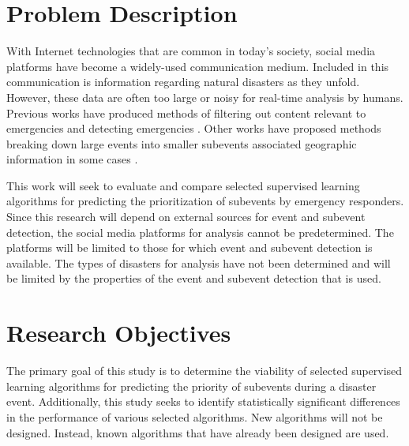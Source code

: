 \documentclass[conference]{IEEEtran}
\begin{document}
\maketitle






%
\IEEEpeerreviewmaketitle



\section{Problem Description}
With Internet technologies that are common in today’s society, social media platforms have become a widely-used communication medium. Included in this communication is information regarding natural disasters as they unfold. However, these data are often too large or noisy for real-time analysis by humans. Previous works have produced methods of filtering out content relevant to emergencies and detecting emergencies \cite{Avvenuti}. Other works have proposed methods breaking down large events into smaller subevents associated geographic information in some cases \cite{Pohl,Khurdiya,Hua}. 

This work will seek to evaluate and compare selected supervised learning algorithms for predicting the prioritization of subevents by emergency responders. Since this research will depend on external sources for event and subevent detection, the social media platforms for analysis cannot be predetermined. The platforms will be limited to those for which event and subevent detection is available. The types of disasters for analysis have not been determined and will be limited by the properties of the event and subevent detection that is used.


\section{Research Objectives}
The primary goal of this study is to determine the viability of selected supervised learning algorithms for predicting the priority of subevents during a disaster event. Additionally, this study seeks to identify statistically significant differences in the performance of various selected algorithms. New algorithms will not be designed. Instead, known algorithms that have already been designed are used.
\end{document}
